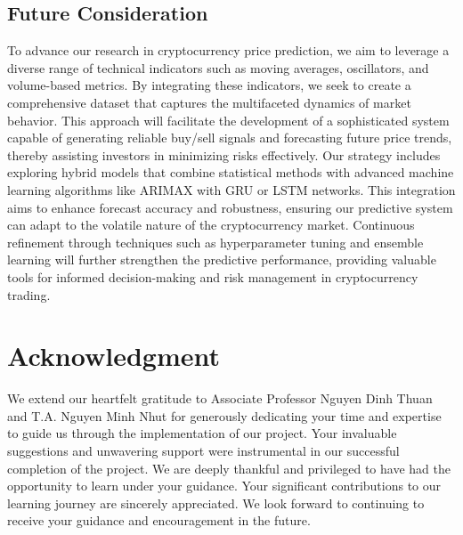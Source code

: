 \documentclass{ieeeojies}
\begin{document}
\subsection{Future Consideration}
To advance our research in cryptocurrency price prediction, we aim to leverage a diverse range of technical indicators such as moving averages, oscillators, and volume-based metrics. By integrating these indicators, we seek to create a comprehensive dataset that captures the multifaceted dynamics of market behavior. This approach will facilitate the development of a sophisticated system capable of generating reliable buy/sell signals and forecasting future price trends, thereby assisting investors in minimizing risks effectively.
Our strategy includes exploring hybrid models that combine statistical methods with advanced machine learning algorithms like ARIMAX with GRU or LSTM networks. This integration aims to enhance forecast accuracy and robustness, ensuring our predictive system can adapt to the volatile nature of the cryptocurrency market. Continuous refinement through techniques such as hyperparameter tuning and ensemble learning will further strengthen the predictive performance, providing valuable tools for informed decision-making and risk management in cryptocurrency trading.




\section*{Acknowledgment}
We extend our heartfelt gratitude to Associate Professor Nguyen Dinh Thuan and T.A. Nguyen Minh Nhut for generously dedicating your time and expertise to guide us through the implementation of our project. Your invaluable suggestions and unwavering support were instrumental in our successful completion of the project. We are deeply thankful and privileged to have had the opportunity to learn under your guidance. Your significant contributions to our learning journey are sincerely appreciated. We look forward to continuing to receive your guidance and encouragement in the future.\\
\end{document}
